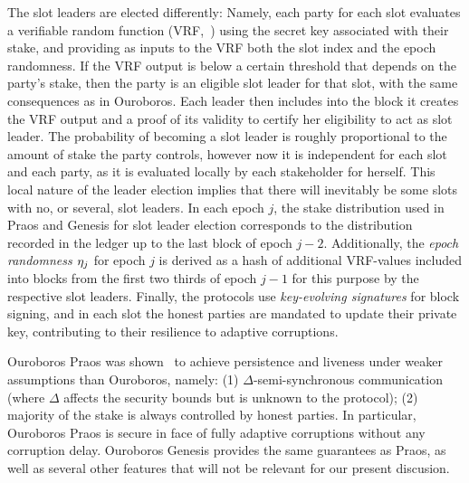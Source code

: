 The slot leaders are elected differently: Namely, each party for each
slot evaluates a verifiable random function (VRF,~\cite{PKC:DodYam05}) using
the secret key associated with their stake, and providing as inputs to the VRF
both the slot index and the epoch randomness. If the VRF output is below a
certain threshold that depends on the party's stake, then the party is an
eligible slot leader  for that slot, with the same consequences as in Ouroboros.
Each leader then includes into the block it creates the VRF output and a
proof of its validity to certify her eligibility to act as slot leader.
%
The probability of becoming a slot leader is roughly proportional to the amount of
stake the party controls, however now it is independent for each slot and each
party, as it is evaluated locally by each stakeholder for herself.  This local
nature of the leader election implies that there will inevitably be some slots
with no, or several, slot leaders.
%
In each epoch $j$, the stake distribution used in Praos and Genesis
for slot leader
election corresponds to the distribution recorded in the ledger up to the last
block of epoch $j-2$.  Additionally, the \emph{epoch randomness $\eta_j$} for epoch $j$
is derived as a hash of additional VRF-values included into blocks
from the first two thirds of epoch $j-1$ for this purpose by the respective slot
leaders.
%
Finally, the protocols use \emph{key-evolving signatures} for
block signing, and in each slot the honest parties are mandated to update their
private key, contributing to their resilience to adaptive corruptions.

Ouroboros Praos was shown~\cite{EC:DGKR18} to achieve
persistence and liveness under weaker assumptions than Ouroboros,
namely:
    (1) $\Delta$-semi-synchronous communication
    (where $\Delta$ affects the security bounds
    but is unknown to the protocol);
    (2) majority of the stake is always controlled by honest parties.
In particular, Ouroboros Praos is secure in face of fully adaptive corruptions
without any corruption  delay.
Ouroboros Genesis provides the same guarantees as Praos, as well as several
other features that will not be relevant for our present
discusion.

